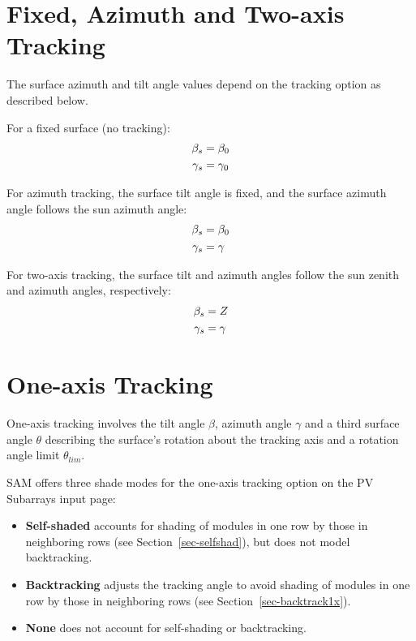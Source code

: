 \documentclass[12pt,letterpaper]{article}
\begin{document}
\section{Fixed, Azimuth and Two-axis Tracking}

The surface azimuth and tilt angle values depend on the tracking option as described below.

For a fixed surface (no tracking):
\begin{align}\label{eqn-fxtilt}
\beta_s &= \beta_0 \notag\\
\gamma_s &= \gamma_0
\end{align}

For azimuth tracking, the surface tilt angle is fixed, and the surface azimuth angle follows the sun azimuth angle:
\begin{align}\label{eqn-aztilt}
\beta_s &= \beta_0 \notag\\
\gamma_s &= \gamma
\end{align}

For two-axis tracking, the surface tilt and azimuth angles follow the sun zenith and azimuth angles, respectively:
\begin{align}\label{eqn-2xtilt}
\beta_s & = Z \notag\\
\gamma_s & = \gamma
\end{align}

\section{One-axis Tracking}

One-axis tracking involves the tilt angle $\beta$, azimuth angle $\gamma$ and a third surface angle $\theta$ describing the surface's rotation about the tracking axis and a rotation angle limit $\theta_{lim}$.

SAM offers three shade modes for the one-axis tracking option on the PV Subarrays input page:
\begin{itemize}
\item \textbf{Self-shaded} accounts for shading of modules in one row by those in neighboring rows (see Section~\ref{sec-selfshad}), but does not model backtracking.
\item \textbf{Backtracking} adjusts the tracking angle to avoid shading of modules in one row by those in neighboring rows (see Section~\ref{sec-backtrack1x}).
\item \textbf{None} does not account for self-shading or backtracking.
\end{itemize}
\end{document}
